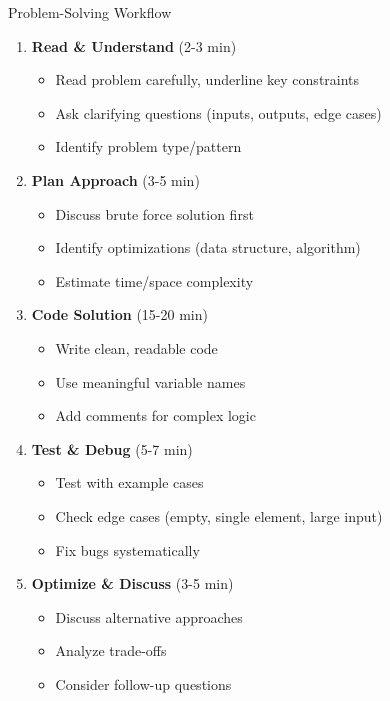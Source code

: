 \documentclass[aspectratio=169,xcolor=dvipsnames]{beamer}
\begin{document}
\begin{frame}{Problem-Solving Workflow}
  \begin{enumerate}
    \item \textbf{Read \& Understand} (2-3 min)
    \begin{itemize}
      \item Read problem carefully, underline key constraints
      \item Ask clarifying questions (inputs, outputs, edge cases)
      \item Identify problem type/pattern
    \end{itemize}

    \vspace{0.2cm}
    \item \textbf{Plan Approach} (3-5 min)
    \begin{itemize}
      \item Discuss brute force solution first
      \item Identify optimizations (data structure, algorithm)
      \item Estimate time/space complexity
    \end{itemize}

    \vspace{0.2cm}
    \item \textbf{Code Solution} (15-20 min)
    \begin{itemize}
      \item Write clean, readable code
      \item Use meaningful variable names
      \item Add comments for complex logic
    \end{itemize}

    \vspace{0.2cm}
    \item \textbf{Test \& Debug} (5-7 min)
    \begin{itemize}
      \item Test with example cases
      \item Check edge cases (empty, single element, large input)
      \item Fix bugs systematically
    \end{itemize}

    \vspace{0.2cm}
    \item \textbf{Optimize \& Discuss} (3-5 min)
    \begin{itemize}
      \item Discuss alternative approaches
      \item Analyze trade-offs
      \item Consider follow-up questions
    \end{itemize}
  \end{enumerate}
\end{frame}
\end{document}

